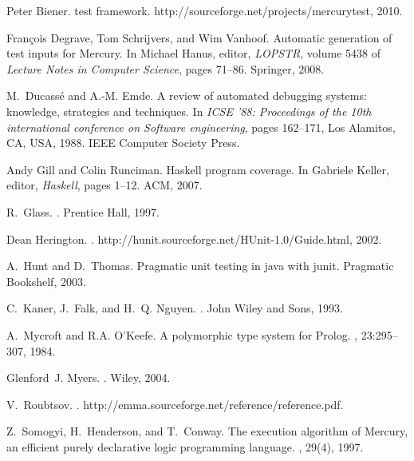 \documentclass[british]{llncs}
\begin{document}
\begin{thebibliography}{10}

Peter Biener.
 test framework.
\newblock http://sourceforge.net/projects/mercurytest, 2010.

Fran\c{c}ois Degrave, Tom Schrijvers, and Wim Vanhoof.
\newblock Automatic generation of test inputs for {M}ercury.
\newblock In Michael Hanus, editor, {\em LOPSTR}, volume 5438 of {\em Lecture
  Notes in Computer Science}, pages 71--86. Springer, 2008.

M.~Ducass\'{e} and A.-M. Emde.
\newblock A review of automated debugging systems: knowledge, strategies and
  techniques.
\newblock In {\em ICSE '88: Proceedings of the 10th international conference on
  Software engineering}, pages 162--171, Los Alamitos, CA, USA, 1988. IEEE
  Computer Society Press.

Andy Gill and Colin Runciman.
\newblock Haskell program coverage.
\newblock In Gabriele Keller, editor, {\em Haskell}, pages 1--12. ACM, 2007.

R.~Glass.
.
\newblock Prentice Hall, 1997.

Dean Herington.
.
\newblock http://hunit.sourceforge.net/HUnit-1.0/Guide.html, 2002.

A.~Hunt and D.~Thomas.
\newblock Pragmatic unit testing in java with junit.
\newblock Pragmatic Bookshelf, 2003.

C.~Kaner, J.~Falk, and H.~Q. Nguyen.
.
\newblock John Wiley and Sons, 1993.

A.~Mycroft and R.A. O'Keefe.
\newblock A polymorphic type system for {P}rolog.
, 23:295--307, 1984.

Glenford~J. Myers.
.
\newblock Wiley, 2004.

V.~Roubtsov.
.
\newblock http://emma.sourceforge.net/reference/reference.pdf.

Z.~Somogyi, H.~Henderson, and T.~Conway.
\newblock The execution algorithm of {M}ercury, an efficient purely declarative
  logic programming language.
, 29(4), 1997.


\end{thebibliography}
\end{document}
